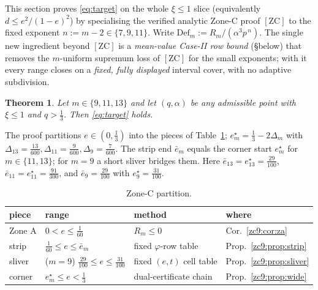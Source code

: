 \documentclass[11pt]{amsart}
\newtheorem{theorem}{Theorem}[section]
\newcommand{\Def}{\mathrm{Def}}
\newcommand{\ZC}{[\textrm{ZC}]}
\begin{document}
This section proves \eqref{eq:target} on the whole $\xi\le1$ slice
(equivalently $d\le e^2/(1-e)^2$) by specialising the verified analytic Zone-C
proof $\ZC$ to the fixed exponent $n:=m-2\in\{7,9,11\}$.  Write
$\Def_m:=R_m/(\alpha^3p^{\,n})$.  The single new ingredient beyond $\ZC$ is a
\emph{mean-value Case-II row bound} (\S below) that removes the $m$-uniform
supremum loss of $\ZC$ for the small exponents; with it every range closes on a
\emph{fixed, fully displayed} interval cover, with no adaptive subdivision.

\begin{theorem}\label{zc9:thm:main}
Let $m\in\{9,11,13\}$ and let $(q,\alpha)$ be any admissible point with $\xi\le1$
and $q>\tfrac13$.  Then \eqref{eq:target} holds.
\end{theorem}

The proof partitions $e\in(0,\tfrac13)$ into the pieces of
Table~\ref{zc9:tab:split}; $e^\star_m=\tfrac13-2\Delta_m$ with
$\Delta_{13}=\tfrac{13}{600},\Delta_{11}=\tfrac9{600},\Delta_9=\tfrac7{600}$.
The strip end $\bar e_m$ equals the corner start $e^\star_m$ for $m\in\{11,13\}$;
for $m=9$ a short sliver bridges them.  Here
$\bar e_{13}=e^\star_{13}=\tfrac{29}{100}$,
$\bar e_{11}=e^\star_{11}=\tfrac{91}{300}$, and $\bar e_{9}=\tfrac{29}{100}$
with $e^\star_9=\tfrac{31}{100}$.
\begin{table}[h]\centering\small
\caption{Zone-C partition.}\label{zc9:tab:split}
\begin{tabular}{llll}\toprule
piece & range & method & where\\\midrule
Zone A & $0<e\le\tfrac1{60}$ & $R_m\le0$ & Cor.~\ref{zc9:cor:za}\\
strip  & $\tfrac1{60}\le e\le \bar e_m$ & fixed $\varphi$-row table & Prop.~\ref{zc9:prop:strip}\\
sliver & ($m=9$) $\tfrac{29}{100}\le e\le\tfrac{31}{100}$ & fixed $(e,t)$ cell table & Prop.~\ref{zc9:prop:sliver}\\
corner & $e^\star_m\le e<\tfrac13$ & dual-certificate chain & Prop.~\ref{zc9:prop:wide}\\
\bottomrule\end{tabular}
\end{table}
\end{document}
